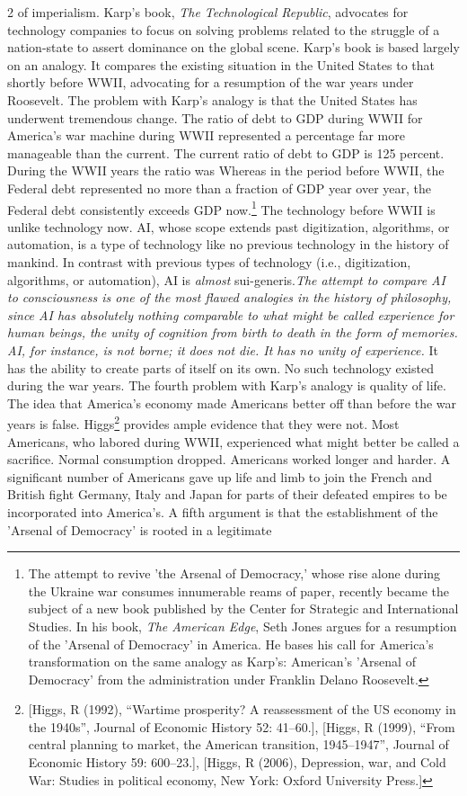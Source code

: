 \documentclass[10pt,a4paper,twoside]{article} %
\begin{document}
\begin{multicols}{2}
of imperialism. Karp's book, \emph{The Technological Republic}, advocates for technology companies to focus on solving problems related to the struggle of a nation-state to assert dominance on the global scene. \newline \indent Karp's book is based largely on an analogy. It compares the existing situation in the United States to that shortly before WWII, advocating for a resumption of the war years under Roosevelt. The problem with Karp's analogy is that the United States has underwent tremendous change. The ratio of debt to GDP during WWII for America's war machine during WWII represented a percentage far more manageable than the current. The current ratio of debt to GDP is 125 percent. During the WWII years the ratio was  Whereas in the period before WWII, the Federal debt represented no more than a fraction of GDP year over year, the Federal debt consistently exceeds GDP now.\footnote{The attempt to revive 'the Arsenal of Democracy,' whose rise alone during the Ukraine war consumes innumerable reams of paper, recently became the subject of a new book published by the Center for Strategic and International Studies. In his book, \emph{The American Edge}, Seth Jones argues for a resumption of the 'Arsenal of Democracy' in America. He bases his call for America's transformation on the same analogy as Karp's: American's 'Arsenal of Democracy' from the administration under Franklin Delano Roosevelt.} The technology before WWII is unlike technology now. AI, whose scope extends past digitization, algorithms, or automation, is a type of technology like no previous technology in the history of mankind. In contrast with previous types of technology (i.e., digitization, algorithms, or automation), AI is \emph{almost} sui-generis.\emph{The attempt to compare AI to consciousness is one of the most flawed analogies in the history of philosophy, since AI has absolutely nothing comparable to what might be called experience for human beings, the unity of cognition from birth to death in the form of memories. AI, for instance, is not borne; it does not die. It has no unity of experience.} It has the ability to create parts of itself on its own. No such technology existed during the war years. The fourth problem with Karp's analogy is quality of life. The idea that America's economy made Americans better off than before the war years is false. Higgs\footnote{[Higgs, R (1992), “Wartime prosperity? A reassessment of the US economy in the 1940s”, Journal of Economic History 52: 41–60.], [Higgs, R (1999), “From central planning to market, the American transition, 1945–1947”, Journal of Economic History 59: 600–23.], [Higgs, R (2006), Depression, war, and Cold War: Studies in political economy, New York: Oxford University Press.]} provides ample evidence that they were not. Most Americans, who labored during WWII, experienced what might better be called a sacrifice. Normal consumption dropped. Americans worked longer and harder. A significant number of Americans gave up life and limb to join the French and British fight Germany, Italy and Japan for parts of their defeated empires to be incorporated into America's. A fifth argument is that the establishment of the 'Arsenal of Democracy' is rooted in a legitimate 
\end{multicols}
\end{document}
